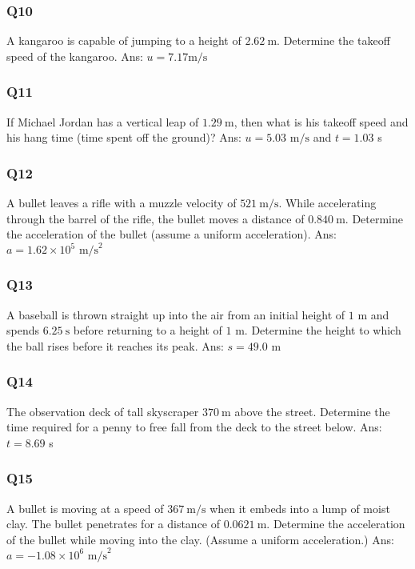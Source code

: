 \documentclass{article}
\begin{document}
\subsubsection{Q10}
A kangaroo is capable of jumping to a height of $2.62 \mathrm{~m}$. Determine the takeoff speed of the kangaroo.
\ifpaper Ans: $u=7.17 \text{m/s}$ \fi
\subsubsection{Q11}
If Michael Jordan has a vertical leap of $1.29 \mathrm{~m}$, then what is his takeoff speed and his hang time (time spent off the ground)?
\ifpaper Ans: $u=5.03 \text{ m/s}$ and $t=1.03$ s \fi
\subsubsection{Q12}
A bullet leaves a rifle with a muzzle velocity of $521 \mathrm{~m} / \mathrm{s}$. While accelerating through the barrel of the rifle, the bullet moves a distance of $0.840 \mathrm{~m}$. Determine the acceleration of the bullet (assume a uniform acceleration).
\ifpaper Ans: $a=1.62 \times 10^5 \text{ m/s}^2 $ \fi

\subsubsection{Q13}
A baseball is thrown straight up into the air from an initial height of $1$ m and spends $6.25 \mathrm{~s}$ before returning to a height of $1$ m. Determine the height to which the ball rises before it reaches its peak. 
\ifpaper Ans: $s=49.0$ m \fi

\subsubsection{Q14}
The observation deck of tall skyscraper $370 \mathrm{~m}$ above the street. Determine the time required for a penny to free fall from the deck to the street below.
\ifpaper Ans: $t=8.69$ s \fi

\subsubsection{Q15}
A bullet is moving at a speed of $367 \mathrm{~m} / \mathrm{s}$ when it embeds into a lump of moist clay. The bullet penetrates for a distance of $0.0621 \mathrm{~m}$. Determine the acceleration of the bullet while moving into the clay. (Assume a uniform acceleration.)
\ifpaper Ans: $a=-1.08\times 10^6 \text{ m/s}^2$ \fi
\end{document}
